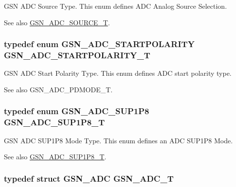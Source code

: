 GSN ADC Source Type. This enum defines ADC Analog Source Selection. 

\begin{DoxySeeAlso}{See also}
\hyperlink{a00643_gab77114095147b118ac43431055973712}{GSN\_\-ADC\_\-SOURCE\_\-T}. 
\end{DoxySeeAlso}
\hypertarget{a00643_gaaafebe738a6902a342c1226ce5ea8598}{
\subsubsection[{GSN\_\-ADC\_\-STARTPOLARITY\_\-T}]{\setlength{\rightskip}{0pt plus 5cm}typedef enum {\bf GSN\_\-ADC\_\-STARTPOLARITY}  {\bf GSN\_\-ADC\_\-STARTPOLARITY\_\-T}}}
\label{a00643_gaaafebe738a6902a342c1226ce5ea8598}


GSN ADC Start Polarity Type. This enum defines ADC start polarity type. 

\begin{DoxySeeAlso}{See also}
GSN\_\-ADC\_\-PDMODE\_\-T. 
\end{DoxySeeAlso}
\hypertarget{a00643_ga79b5244aa923d094c80c37462b10dded}{
\subsubsection[{GSN\_\-ADC\_\-SUP1P8\_\-T}]{\setlength{\rightskip}{0pt plus 5cm}typedef enum {\bf GSN\_\-ADC\_\-SUP1P8}  {\bf GSN\_\-ADC\_\-SUP1P8\_\-T}}}
\label{a00643_ga79b5244aa923d094c80c37462b10dded}


GSN ADC SUP1P8 Mode Type. This enum defines an ADC SUP1P8 Mode. 

\begin{DoxySeeAlso}{See also}
\hyperlink{a00643_ga79b5244aa923d094c80c37462b10dded}{GSN\_\-ADC\_\-SUP1P8\_\-T}. 
\end{DoxySeeAlso}
\hypertarget{a00643_ga9f5c392bf9244880ab92d22101c6131d}{
\subsubsection[{GSN\_\-ADC\_\-T}]{\setlength{\rightskip}{0pt plus 5cm}typedef struct {\bf GSN\_\-ADC}  {\bf GSN\_\-ADC\_\-T}}}
\label{a00643_ga9f5c392bf9244880ab92d22101c6131d}


